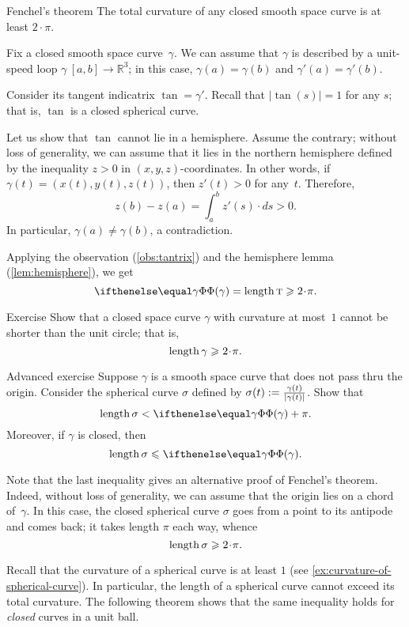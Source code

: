 \begin{thm}{Fenchel's theorem}
\label{thm:fenchel}
The total curvature of any closed smooth space curve is at least $2\cdot\pi$.
\end{thm}

Fix a closed smooth space curve~$\gamma$.
We can assume that $\gamma$ is described by a unit-speed loop $\gamma\:[a,b]\to \mathbb{R}^3$;
in this case, $\gamma(a)=\gamma(b)$ and $\gamma'(a)=\gamma'(b)$.

Consider its tangent indicatrix $\tan=\gamma'$.
Recall that $|\tan(s)|=1$ for any $s$; that is, $\tan$ is a closed spherical curve.

Let us show that $\tan$ cannot lie in a hemisphere.
Assume the contrary; without loss of generality, we can assume that it lies in the northern hemisphere defined by the inequality $z>0$ in $(x,y,z)$-coordinates.
In other words, if $\gamma(t)=(x(t), y(t), z(t))$, then $z'(t)>0$ for any~$t$.
Therefore,
\[z(b)-z(a)=\int_a^b z'(s)\cdot ds>0.\]
In particular, $\gamma(a)\ne \gamma(b)$, a contradiction.

Applying the observation (\ref{obs:tantrix}) and the hemisphere lemma (\ref{lem:hemisphere}), we get  
\[\tc\gamma=\length \tan\ge2\cdot\pi.\]
\qedsf

\begin{thm}{Exercise}\label{ex:length>=2pi}
Show that a closed space curve $\gamma$ with curvature at most~$1$ cannot be shorter than the unit circle;
that is, 
\[\length\gamma\ge 2\cdot \pi.\]

\end{thm}


\begin{thm}{Advanced exercise}\label{ex:gamma/|gamma|}
Suppose $\gamma$ is a smooth space curve that does not pass thru the origin.
Consider the spherical curve $\sigma$ defined by $\sigma(t)\z\df\frac{\gamma(t)}{|\gamma(t)|}$.
Show that 
\[\length \sigma< \tc\gamma+\pi.\]
Moreover, if $\gamma$ is closed, then
\[\length \sigma\le \tc\gamma.\]
\end{thm}

Note that the last inequality gives an alternative proof of Fenchel's theorem.
Indeed, without loss of generality, we can assume that the origin lies on a chord of~$\gamma$.
In this case, the closed spherical curve $\sigma$ goes from a point to its antipode and comes back; 
it takes length $\pi$ each way, 
whence 
\[\length\sigma\ge 2\cdot\pi.\]

Recall that the curvature of a spherical curve is at least $1$
(see \ref{ex:curvature-of-spherical-curve}).
In particular, the length of a spherical curve cannot exceed its total curvature.
The following theorem shows that the same inequality holds for \textit{closed} curves in a unit ball.

